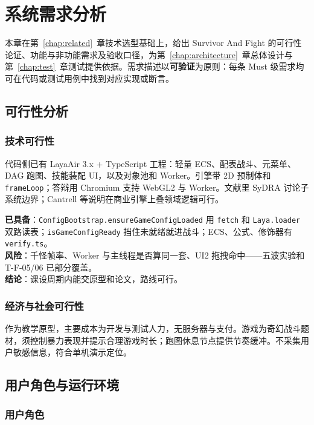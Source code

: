 \chapter{系统需求分析}
\label{chap:requirement}

本章在第~\ref{chap:related}~章技术选型基础上，给出 Survivor And Fight 的可行性论证、功能与非功能需求及验收口径，为第~\ref{chap:architecture}~章总体设计与第~\ref{chap:test}~章测试提供依据。需求描述以\textbf{可验证}为原则：每条 Must 级需求均可在代码或测试用例中找到对应实现或断言。

\section{可行性分析}

\subsection{技术可行性}

代码侧已有 LayaAir 3.x + TypeScript 工程：轻量 ECS、配表战斗、元菜单、DAG 跑图、技能装配 UI，以及对象池和 Worker。引擎带 2D 预制体和 \texttt{frameLoop}；答辩用 Chromium 支持 WebGL2 与 Worker。文献里 SyDRA 讨论子系统边界\cite{ullmann2025sydra}；Cantrell 等说明在商业引擎上叠领域逻辑可行\cite{cantrell2018unity}。

\textbf{已具备}：\texttt{ConfigBootstrap.ensureGameConfigLoaded} 用 \texttt{fetch} 和 \texttt{Laya.loader} 双路读表；\texttt{isGameConfigReady} 挡住未就绪就进战斗；ECS、公式、修饰器有 \texttt{verify.ts}。\\
\textbf{风险}：千怪帧率、Worker 与主线程是否算同一套、UI2 拖拽命中——五波实验和 T-F-05/06 已部分覆盖。\\
\textbf{结论}：课设周期内能交原型和论文，路线可行。

\subsection{经济与社会可行性}

作为教学原型，主要成本为开发与测试人力，无服务器与支付。游戏为奇幻战斗题材，须控制暴力表现并提示合理游戏时长；跑图休息节点提供节奏缓冲。不采集用户敏感信息，符合单机演示定位。

\section{用户角色与运行环境}

\subsection{用户角色}

